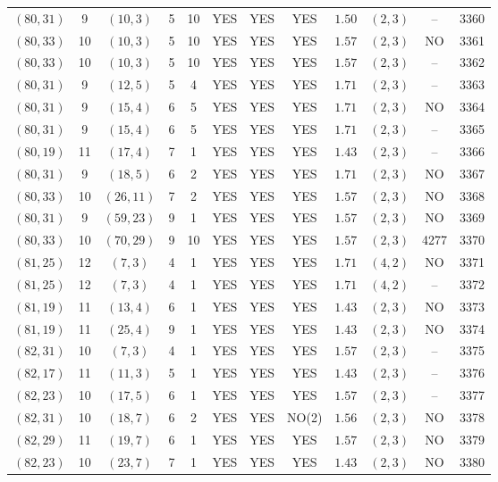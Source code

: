 \begin{longtable}{|c|c|c|c|c|c|c|c|c|c|c|c|}
$(80,31)$ & 9 & $(10,3)$ & 5 & 10 & YES & YES & YES & $1.50$ & $(2,3)$ & -- & 3360\\
$(80,33)$ & 10 & $(10,3)$ & 5 & 10 & YES & YES & YES & $1.57$ & $(2,3)$ & NO & 3361\\
$(80,33)$ & 10 & $(10,3)$ & 5 & 10 & YES & YES & YES & $1.57$ & $(2,3)$ & -- & 3362\\
$(80,31)$ & 9 & $(12,5)$ & 5 & 4 & YES & YES & YES & $1.71$ & $(2,3)$ & -- & 3363\\
$(80,31)$ & 9 & $(15,4)$ & 6 & 5 & YES & YES & YES & $1.71$ & $(2,3)$ & NO & 3364\\
$(80,31)$ & 9 & $(15,4)$ & 6 & 5 & YES & YES & YES & $1.71$ & $(2,3)$ & -- & 3365\\
$(80,19)$ & 11 & $(17,4)$ & 7 & 1 & YES & YES & YES & $1.43$ & $(2,3)$ & -- & 3366\\
$(80,31)$ & 9 & $(18,5)$ & 6 & 2 & YES & YES & YES & $1.71$ & $(2,3)$ & NO & 3367\\
$(80,33)$ & 10 & $(26,11)$ & 7 & 2 & YES & YES & YES & $1.57$ & $(2,3)$ & NO & 3368\\
$(80,31)$ & 9 & $(59,23)$ & 9 & 1 & YES & YES & YES & $1.57$ & $(2,3)$ & NO & 3369\\
$(80,33)$ & 10 & $(70,29)$ & 9 & 10 & YES & YES & YES & $1.57$ & $(2,3)$ & 4277 & 3370\\
$(81,25)$ & 12 & $(7,3)$ & 4 & 1 & YES & YES & YES & $1.71$ & $(4,2)$ & NO & 3371\\
$(81,25)$ & 12 & $(7,3)$ & 4 & 1 & YES & YES & YES & $1.71$ & $(4,2)$ & -- & 3372\\
$(81,19)$ & 11 & $(13,4)$ & 6 & 1 & YES & YES & YES & $1.43$ & $(2,3)$ & NO & 3373\\
$(81,19)$ & 11 & $(25,4)$ & 9 & 1 & YES & YES & YES & $1.43$ & $(2,3)$ & NO & 3374\\
$(82,31)$ & 10 & $(7,3)$ & 4 & 1 & YES & YES & YES & $1.57$ & $(2,3)$ & -- & 3375\\
$(82,17)$ & 11 & $(11,3)$ & 5 & 1 & YES & YES & YES & $1.43$ & $(2,3)$ & -- & 3376\\
$(82,23)$ & 10 & $(17,5)$ & 6 & 1 & YES & YES & YES & $1.57$ & $(2,3)$ & -- & 3377\\
$(82,31)$ & 10 & $(18,7)$ & 6 & 2 & YES & YES & NO(2) & $1.56$ & $(2,3)$ & NO & 3378\\
$(82,29)$ & 11 & $(19,7)$ & 6 & 1 & YES & YES & YES & $1.57$ & $(2,3)$ & NO & 3379\\
$(82,23)$ & 10 & $(23,7)$ & 7 & 1 & YES & YES & YES & $1.43$ & $(2,3)$ & NO & 3380\\

\end{longtable}
